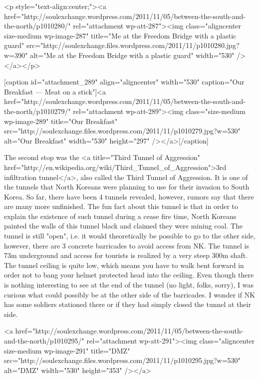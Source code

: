 \begin{post}
\begin{content}
<p style="text-align:center;"><a href="http://soulexchange.wordpress.com/2011/11/05/between-the-south-and-the-north/p1010280/" rel="attachment wp-att-287"><img class="aligncenter size-medium wp-image-287" title="Me at the Freedom Bridge with a plastic guard" src="http://soulexchange.files.wordpress.com/2011/11/p1010280.jpg?w=390" alt="Me at the Freedom Bridge with a plastic guard" width="530" /></a></p>





[caption id="attachment_289" align="aligncenter" width="530" caption="Our Breakfast — Meat on a stick"]<a href="http://soulexchange.wordpress.com/2011/11/05/between-the-south-and-the-north/p1010279/" rel="attachment wp-att-289"><img class="size-medium wp-image-289" title="Our Breakfast" src="http://soulexchange.files.wordpress.com/2011/11/p1010279.jpg?w=530" alt="Our Breakfast" width="530" height="297" /></a>[/caption]



The second stop was the <a title="Third Tunnel of Aggression" href="http://en.wikipedia.org/wiki/Third_Tunnel_of_Aggression">3rd infiltration tunnel</a>, also called the Third Tunnel of Aggression. It is one of the tunnels that North Koreans were planning to use for their invasion to South Korea. So far, there have been 4 tunnels revealed, however, rumors say that there are many more unfinished. The fun fact about this tunnel is that in order to explain the existence of such tunnel during a cease fire time, North Koreans painted the walls of this tunnel black and claimed they were mining coal. The tunnel is still "open", i.e. it would theoretically be possible to go to the other side, however, there are 3 concrete barricades to avoid access from NK. The tunnel is 73m underground and access for tourists is realized by a very steep 300m shaft. The tunnel ceiling is quite low, which means you have to walk bent forward in order not to bang your helmet protected head into the ceiling. Even though there is nothing interesting to see at the end of the tunnel (no light, folks, sorry), I was curious what could possibly be at the other side of the barricades. I wonder if NK has some soldiers stationed there or if they had simply closed the tunnel at their side.



<a href="http://soulexchange.wordpress.com/2011/11/05/between-the-south-and-the-north/p1010295/" rel="attachment wp-att-291"><img class="aligncenter size-medium wp-image-291" title="DMZ" src="http://soulexchange.files.wordpress.com/2011/11/p1010295.jpg?w=530" alt="DMZ" width="530" height="353" /></a>




\end{content}
\end{post}

